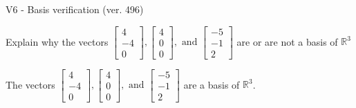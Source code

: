 \begin{exercise}
  \begin{exerciseTitle}V6 - Basis verification (ver. 496)\end{exerciseTitle}
  \begin{exerciseStatement}
    Explain why the vectors \(\left[\begin{array}{r}
4 \\
-4 \\
0
\end{array}\right] , \left[\begin{array}{r}
4 \\
0 \\
0
\end{array}\right] , \text{ and } \left[\begin{array}{r}
-5 \\
-1 \\
2
\end{array}\right]\) are or are not a basis of \(\mathbb{R}^3\)	


  \end{exerciseStatement}
  \begin{exerciseAnswer}
   The vectors \(\left[\begin{array}{r}
4 \\
-4 \\
0
\end{array}\right] , \left[\begin{array}{r}
4 \\
0 \\
0
\end{array}\right] , \text{ and } \left[\begin{array}{r}
-5 \\
-1 \\
2
\end{array}\right]\) 
  	 are  a basis of \(\mathbb{R}^3\).
  


  \end{exerciseAnswer}
\end{exercise}